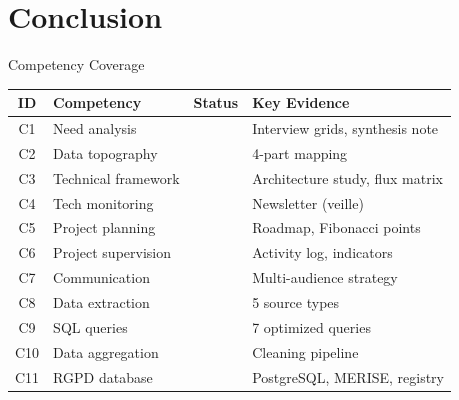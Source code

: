 \documentclass[aspectratio=169, 10pt]{beamer}
\newcommand{\fullcov}{\textcolor{ntgreen}{\faCheckCircle}}
\begin{document}
\section{Conclusion}

\begin{frame}{Competency Coverage}
\small
\begin{tabular}{clcl}
  \toprule
  \textbf{ID} & \textbf{Competency} & \textbf{Status} & \textbf{Key Evidence}\\
  \midrule
  C1 & Need analysis & \fullcov & Interview grids, synthesis note\\
  C2 & Data topography & \fullcov & 4-part mapping\\
  C3 & Technical framework & \fullcov & Architecture study, flux matrix\\
  C4 & Tech monitoring & \fullcov & Newsletter (veille)\\
  C5 & Project planning & \fullcov & Roadmap, Fibonacci points\\
  C6 & Project supervision & \fullcov & Activity log, indicators\\
  C7 & Communication & \fullcov & Multi-audience strategy\\
  C8 & Data extraction & \fullcov & 5 source types\\
  C9 & SQL queries & \fullcov & 7 optimized queries\\
  C10 & Data aggregation & \fullcov & Cleaning pipeline\\
  C11 & RGPD database & \fullcov & PostgreSQL, MERISE, registry\\
  \bottomrule
\end{tabular}

\end{frame}
\end{document}
